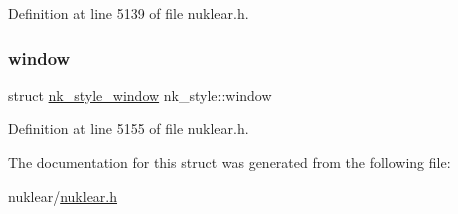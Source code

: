 Definition at line 5139 of file nuklear.\+h.

\mbox{\label{structnk__style_abab238d75bb12b1270171909a9b3e21a}} 
\subsubsection{\texorpdfstring{window}{window}}
{\footnotesize\ttfamily struct \mbox{\hyperlink{structnk__style__window}{nk\+\_\+style\+\_\+window}} nk\+\_\+style\+::window}



Definition at line 5155 of file nuklear.\+h.



The documentation for this struct was generated from the following file\+:\begin{DoxyCompactItemize}
\item 
nuklear/\mbox{\hyperlink{nuklear_8h}{nuklear.\+h}}\end{DoxyCompactItemize}
